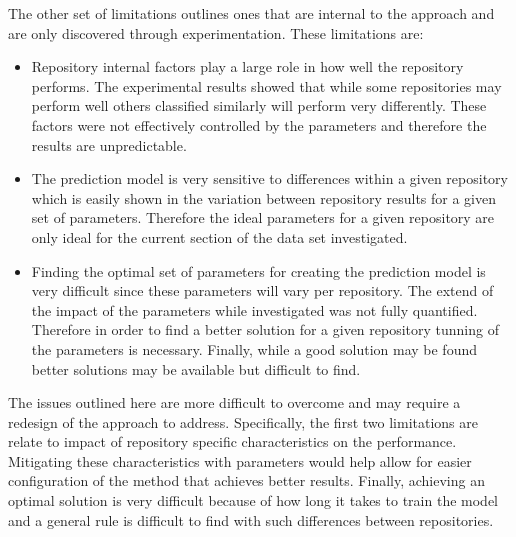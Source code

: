 The other set of limitations outlines ones that are internal to the approach and are only discovered through experimentation. These limitations are:
\begin{itemize}
\item Repository internal factors play a large role in how well the repository performs. The experimental results showed that while some repositories may perform well others classified similarly will perform very differently. These factors were not effectively controlled by the parameters and therefore the results are unpredictable.
\item The prediction model is very sensitive to differences within a given repository which is easily shown in the variation between repository results for a given set of parameters. Therefore the ideal parameters for a given repository are only ideal for the current section of the data set investigated.
\item Finding the optimal set of parameters for creating the prediction model is very difficult since these parameters will vary per repository. The extend of the impact of the parameters while investigated was not fully quantified. Therefore in order to find a better solution for a given repository tunning of the parameters is necessary. Finally, while a good solution may be found better solutions may be available but difficult to find.
\end{itemize}
The issues outlined here are more difficult to overcome and may require a redesign of the approach to address. Specifically, the first two limitations are relate to impact of repository specific characteristics on the performance. Mitigating these characteristics with parameters would help allow for easier configuration of the method that achieves better results. Finally, achieving an optimal solution is very difficult because of how long it takes to train the model and a general rule is difficult to find with such differences between repositories. 

